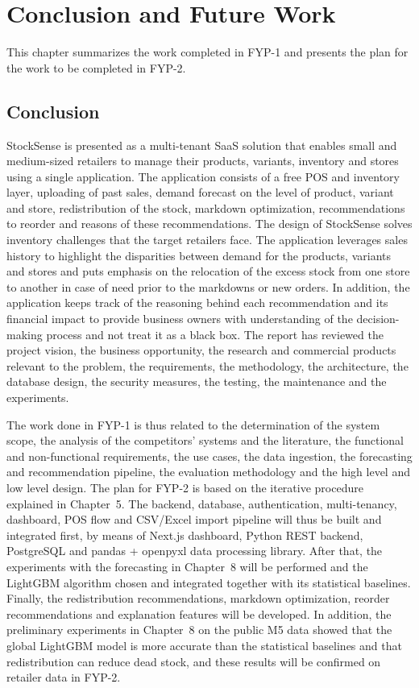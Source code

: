 \documentclass{StockSense}
\begin{document}
\chapter{Conclusion and Future Work}

This chapter summarizes the work completed in FYP-1 and presents the plan for the work to be completed in FYP-2.

\section{Conclusion}

StockSense is presented as a multi-tenant SaaS solution that enables small and medium-sized retailers to manage their products, variants, inventory and stores using a single application. The application consists of a free POS and inventory layer, uploading of past sales, demand forecast on the level of product, variant and store, redistribution of the stock, markdown optimization, recommendations to reorder and reasons of these recommendations. The design of StockSense solves inventory challenges that the target retailers face. The application leverages sales history to highlight the disparities between demand for the products, variants and stores and puts emphasis on the relocation of the excess stock from one store to another in case of need prior to the markdowns or new orders. In addition, the application keeps track of the reasoning behind each recommendation and its financial impact to provide business owners with understanding of the decision-making process and not treat it as a black box. The report has reviewed the project vision, the business opportunity, the research and commercial products relevant to the problem, the requirements, the methodology, the architecture, the database design, the security measures, the testing, the maintenance and the experiments.

The work done in FYP-1 is thus related to the determination of the system scope, the analysis of the competitors' systems and the literature, the functional and non-functional requirements, the use cases, the data ingestion, the forecasting and recommendation pipeline, the evaluation methodology and the high level and low level design. The plan for FYP-2 is based on the iterative procedure explained in Chapter~5. The backend, database, authentication, multi-tenancy, dashboard, POS flow and CSV/Excel import pipeline will thus be built and integrated first, by means of Next.js dashboard, Python REST backend, PostgreSQL and pandas + openpyxl data processing library. After that, the experiments with the forecasting in Chapter~8 will be performed and the LightGBM algorithm chosen and integrated together with its statistical baselines. Finally, the redistribution recommendations, markdown optimization, reorder recommendations and explanation features will be developed. In addition, the preliminary experiments in Chapter~8 on the public M5 data showed that the global LightGBM model is more accurate than the statistical baselines and that redistribution can reduce dead stock, and these results will be confirmed on retailer data in FYP-2.
\end{document}
